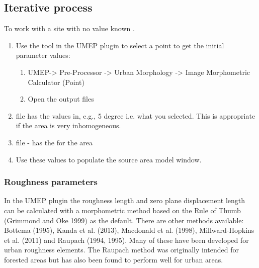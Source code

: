 \documentclass[letterpaper,10pt,english]{sphinxmanual}
\begin{document}
\subsection{Iterative process}
\label{\detokenize{Tutorials/Footprint:iterative-process}}
To work with a site with no value known .
\begin{enumerate}
\item {} 
Use the {\hyperref[\detokenize{pre-processor/Urban Morphology Morphometric Calculator (Point):morphometriccalculator-point}]{}} tool in the UMEP plugin to select a
point to get the initial parameter values:
\begin{enumerate}
\item {} 
UMEP-\textgreater{} Pre-Processor -\textgreater{} Urban Morphology -\textgreater{} Image Morphometric
Calculator (Point)

\item {} 
Open the output files

\end{enumerate}

\item {} 
 file \textendash{} has the values in, e.g., 5 degree 
\textendash{} i.e. what you selected. This is appropriate if the area is very
inhomogeneous.

\item {} 
 file - has the  for the area

\item {} 
Use these values to populate the source area model window.

\end{enumerate}


\subsubsection{Roughness parameters}
\label{\detokenize{Tutorials/Footprint:roughness-parameters}}
In the UMEP plugin the roughness length and zero plane displacement
length can be calculated with a morphometric method based on the Rule of
Thumb (Grimmond and Oke 1999) as the default. There are other methods
available: Bottema (1995), Kanda et al. (2013), Macdonald et al. (1998),
Millward-Hopkins et al. (2011) and Raupach (1994, 1995). Many of these
have been developed for urban roughness elements. The Raupach method was
originally intended for forested areas but has also been found to
perform well for urban areas.
\end{document}
